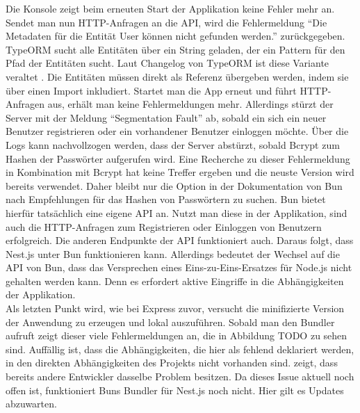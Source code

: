 {

\noindent
Die Konsole zeigt beim erneuten Start der Applikation keine Fehler mehr an. Sendet man nun HTTP-Anfragen an die API, wird die Fehlermeldung ``Die Metadaten für die Entität User können nicht gefunden werden.'' zurückgegeben. TypeORM sucht alle Entitäten über ein String geladen, der ein Pattern für den Pfad der Entitäten sucht. Laut Changelog von TypeORM ist diese Variante veraltet . Die Entitäten müssen direkt als Referenz übergeben werden, indem sie über einen Import inkludiert. \newline
Startet man die App erneut und führt HTTP-Anfragen aus, erhält man keine Fehlermeldungen mehr. Allerdings stürzt der Server mit der Meldung ``Segmentation Fault'' ab, sobald ein sich ein neuer Benutzer registrieren oder ein vorhandener Benutzer einloggen möchte. Über die Logs kann nachvollzogen werden, dass der Server abstürzt, sobald Bcrypt zum Hashen der Passwörter aufgerufen wird. Eine Recherche zu dieser Fehlermeldung in Kombination mit Bcrypt hat keine Treffer ergeben und die neuste Version wird bereits verwendet. Daher bleibt nur die Option in der Dokumentation von Bun nach Empfehlungen für das Hashen von Passwörtern zu suchen. Bun bietet hierfür tatsächlich eine eigene API an. Nutzt man diese in der Applikation, sind auch die HTTP-Anfragen zum Registrieren oder Einloggen von Benutzern erfolgreich. Die anderen Endpunkte der API funktioniert auch. Daraus folgt, dass Nest.js unter Bun funktionieren kann. Allerdings bedeutet der Wechsel auf die API von Bun, dass das Versprechen eines Eins-zu-Eins-Ersatzes für Node.js nicht gehalten werden kann. Denn es erfordert aktive Eingriffe in die Abhängigkeiten der Applikation. \\

\noindent
Als letzten Punkt wird, wie bei Express zuvor, versucht die minifizierte Version der Anwendung zu erzeugen und lokal auszuführen. Sobald man den Bundler aufruft zeigt dieser viele Fehlermeldungen an, die in Abbildung TODO zu sehen sind. Auffällig ist, dass die Abhängigkeiten, die hier als fehlend deklariert werden, in den direkten Abhängigkeiten des Projekts nicht vorhanden sind.  zeigt, dass bereits andere Entwickler dasselbe Problem besitzen. Da dieses Issue aktuell noch offen ist, funktioniert Buns Bundler für Nest.js noch nicht. Hier gilt es Updates abzuwarten.

}
